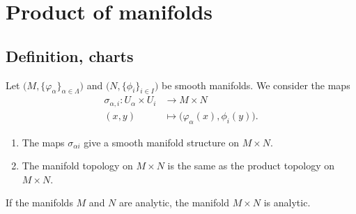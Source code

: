 

\section{Product of manifolds}

\subsection{Definition, charts}


\begin{propositionDef}      \label{DEFooYOLXooDPrnHa}
	Let \( \big( M,\{ \varphi_{\alpha} \}_{\alpha\in \Lambda} \big)\) and \( \big( N,\{ \phi_i \}_{i\in I} \big)\) be smooth manifolds. We consider the maps
	\begin{equation}
		\begin{aligned}
			\sigma_{\alpha,i}\colon U_{\alpha}\times U_i & \to M\times N                                       \\
			(x,y)                                        & \mapsto \big( \varphi_{\alpha}(x), \phi_i(y) \big).
		\end{aligned}
	\end{equation}
	\begin{enumerate}
		\item
		      The maps \( \sigma_{\alpha i}\) give a smooth manifold structure on \( M\times N\).
		\item
		      The manifold topology on \( M\times N\) is the same as the product topology on \( M\times N\).
	\end{enumerate}
	If the manifolds \( M\) and \( N\) are analytic, the manifold \( M\times N\) is analytic.
\end{propositionDef}

